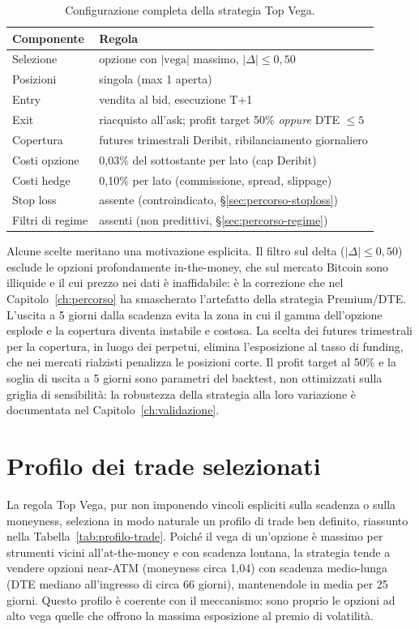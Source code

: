\begin{table}[H]
\centering
\caption{Configurazione completa della strategia Top Vega.}
\label{tab:configurazione}
\begin{tabular}{ll}
\toprule
\textbf{Componente} & \textbf{Regola} \\
\midrule
Selezione & opzione con $|\text{vega}|$ massimo, $|\Delta| \le 0{,}50$ \\
Posizioni & singola (max 1 aperta) \\
Entry & vendita al bid, esecuzione T+1 \\
Exit & riacquisto all'ask; profit target 50\% \emph{oppure} DTE $\le 5$ \\
Copertura & futures trimestrali Deribit, ribilanciamento giornaliero \\
Costi opzione & 0,03\% del sottostante per lato (cap Deribit) \\
Costi hedge & 0,10\% per lato (commissione, spread, slippage) \\
Stop loss & assente (controindicato, \S\ref{sec:percorso-stoploss}) \\
Filtri di regime & assenti (non predittivi, \S\ref{sec:percorso-regime}) \\
\bottomrule
\end{tabular}
\end{table}

Alcune scelte meritano una motivazione esplicita. Il filtro sul delta
($|\Delta| \le 0{,}50$) esclude le opzioni profondamente in-the-money, che
sul mercato Bitcoin sono illiquide e il cui prezzo nei dati è inaffidabile:
è la correzione che nel Capitolo~\ref{ch:percorso} ha smascherato
l'artefatto della strategia Premium/DTE. L'uscita a 5 giorni dalla scadenza
evita la zona in cui il gamma dell'opzione esplode e la copertura diventa
instabile e costosa. La scelta dei futures trimestrali per la copertura, in
luogo dei perpetui, elimina l'esposizione al tasso di funding, che nei
mercati rialzisti penalizza le posizioni corte. Il profit target al 50\% e
la soglia di uscita a 5 giorni sono parametri del backtest, non ottimizzati
sulla griglia di sensibilità: la robustezza della strategia alla loro
variazione è documentata nel Capitolo~\ref{ch:validazione}.

\section{Profilo dei trade selezionati}
\label{sec:strategia-profilo}

La regola Top Vega, pur non imponendo vincoli espliciti sulla scadenza o
sulla moneyness, seleziona in modo naturale un profilo di trade ben
definito, riassunto nella Tabella~\ref{tab:profilo-trade}. Poiché il vega di
un'opzione è massimo per strumenti vicini all'at-the-money e con scadenza
lontana, la strategia tende a vendere opzioni near-ATM (moneyness circa
1,04) con scadenza medio-lunga (DTE mediano all'ingresso di circa 66
giorni), mantenendole in media per 25 giorni. Questo profilo è coerente con
il meccanismo: sono proprio le opzioni ad alto vega quelle che offrono la
massima esposizione al premio di volatilità.

